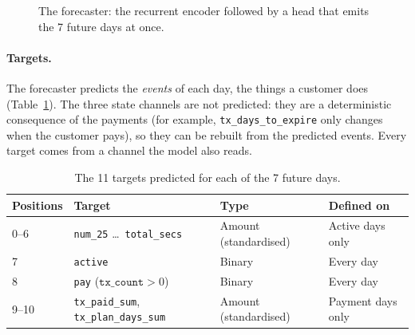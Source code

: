 \documentclass{article}
\begin{document}
\begin{figure}[H]
\centering
{}
\caption{The forecaster: the recurrent encoder followed by a head that emits the 7 future days at once.}
\label{fig:w2_arch_traj}
\end{figure}

\paragraph{Targets.} The forecaster predicts the \emph{events} of each day, the things a customer does (Table~\ref{tab:w2_targets}). The three state channels are not predicted: they are a deterministic consequence of the payments (for example, \texttt{tx\_days\_to\_expire} only changes when the customer pays), so they can be rebuilt from the predicted events. Every target comes from a channel the model also reads.

\begin{table}[H]
\centering
\renewcommand{\arraystretch}{1.3}
\begin{tabularx}{\textwidth}{|l|l|l|X|}
\hline
\textbf{Positions} & \textbf{Target} & \textbf{Type} & \textbf{Defined on} \\ \hline
0--6  & \texttt{num\_25} \dots\ \texttt{total\_secs} & Amount (standardised) & Active days only \\ \hline
7     & \texttt{active} & Binary & Every day \\ \hline
8     & \texttt{pay} ($\texttt{tx\_count} > 0$) & Binary & Every day \\ \hline
9--10 & \texttt{tx\_paid\_sum}, \texttt{tx\_plan\_days\_sum} & Amount (standardised) & Payment days only \\ \hline
\end{tabularx}
\caption{The 11 targets predicted for each of the 7 future days.}
\label{tab:w2_targets}
\end{table}
\end{document}
